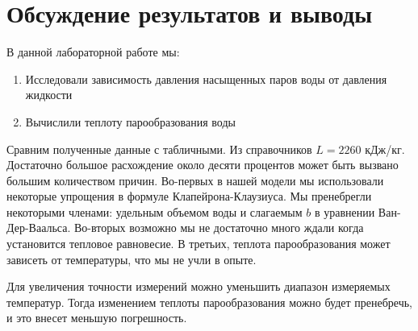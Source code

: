 \documentclass[a4paper, 12pt]{article}
\begin{document}
	\section{Обсуждение результатов и выводы}

	В данной лабораторной работе мы:
	\begin{enumerate}
		\item Исследовали зависимость давления насыщенных паров воды от давления жидкости
		\item Вычислили теплоту парообразования воды
	\end{enumerate} 
	Сравним полученные данные с табличными. Из справочников $L = 2260$ кДж/кг. Достаточно большое расхождение около десяти процентов может быть вызвано большим количеством причин. Во-первых в нашей модели мы использовали некоторые упрощения в формуле 
	Клапейрона-Клаузиуса. Мы пренебрегли некоторыми членами: удельным объемом воды и слагаемым $b$ в уравнении Ван-Дер-Ваальса. Во-вторых возможно мы не достаточно много ждали когда установится тепловое равновесие. В третьих, теплота парообразования может зависеть от температуры, что мы не учли в опыте. 
	\par Для увеличения точности измерений можно уменьшить диапазон измеряемых температур. Тогда изменением теплоты парообразования можно будет пренебречь, и это внесет меньшую погрешность. 
	\newpage

	
\end{document}

